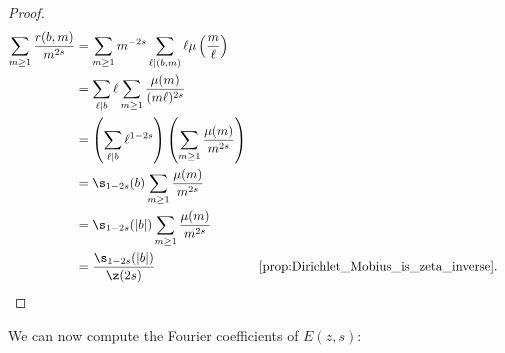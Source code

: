 \begin{proof}
\begin{align*}
          \sum_{m \ge 1}\frac{r(b,m)}{m^{2s}} &= \sum_{m \ge 1}m^{-2s}\sum_{\ell \mid (b,m)}\ell\mu\left(\frac{m}{\ell}\right) \\
          &= \sum_{\ell \mid b}\ell\sum_{m \ge 1}\frac{\mu(m)}{(m\ell)^{2s}} \\
          &= \left(\sum_{\ell \mid b}\ell^{1-2s}\right)\left(\sum_{m \ge 1}\frac{\mu(m)}{m^{2s}}\right) \\
          &= \s_{1-2s}(b)\sum_{m \ge 1}\frac{\mu(m)}{m^{2s}} \\
          &= \s_{1-2s}(|b|)\sum_{m \ge 1}\frac{\mu(m)}{m^{2s}} \\
          &= \frac{\s_{1-2s}(|b|)}{\z(2s)} && \text{\cref{prop:Dirichlet_Mobius_is_zeta_inverse}}.
        \end{align*}
      \end{proof}

      We can now compute the Fourier coefficients of $E(z,s)$:

